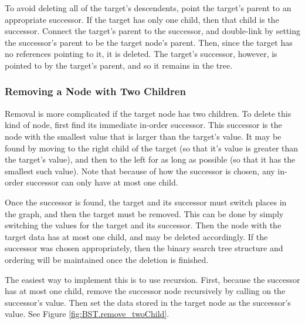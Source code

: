 To avoid deleting all of the target's descendents, point the target's parent to an appropriate successor.
If the target has only one child, then that child is the successor.
Connect the target's parent to the successor, and double-link by setting the successor's parent to be the target node's parent.
Then, since the target has no references pointing to it, it is deleted.
The target's successor, however, is pointed to by the target's parent, and so it remains in the tree.

\subsubsection*{Removing a Node with Two Children} %

Removal is more complicated if the target node has two children.
To delete this kind of node, first find its immediate in-order successor.
This successor is the node with the smallest value that is larger than the target's value.
It may be found by moving to the right child of the target (so that it's value is greater than the target's value), and then to the left for as long as possible (so that it has the smallest such value).
Note that because of how the successor is chosen, any in-order successor can only have at most one child.

Once the successor is found, the target and its successor must switch places in the graph, and then the target must be removed.
This can be done by simply switching the values for the target and its successor.
Then the node with the target data has at most one child, and may be deleted accordingly.
If the successor was chosen appropriately, then the binary search tree structure and ordering will be maintained once the deletion is finished.

The easiest way to implement this is to use recursion.
First, because the successor has at most one child, remove the successor node recursively by calling  on the successor's value.
Then set the data stored in the target node as the successor's value.
See Figure \ref{fig:BST.remove_twoChild}.

